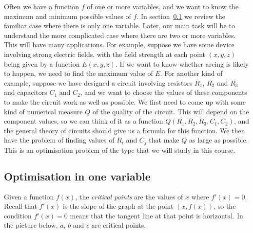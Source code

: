 \documentclass[reqno]{amsart}
\theoremstyle{definition}
\begin{document}
Often we have a function $f$ of one or more variables, and we want to
know the maximum and minimum possible values of $f$.  In
section~\ref{subsec-opt-one} we review the familiar case where there
is only one variable.  Later, our main task will be to understand the
more complicated case where there are two or more variables.  This
will have many applications.  For example, suppose we have some device
involving strong electric fields, with the field strength at each
point $(x,y,z)$ being given by a function $E(x,y,z)$.  If we want to
know whether arcing is likely to happen, we need to find the maximum
value of $E$.  For another kind of example, suppose we have designed a
circuit involving resistors $R_1$, $R_2$ and $R_3$ and capacitors
$C_1$ and $C_2$, and we want to choose the values of these components
to make the circuit work as well as possible.  We first need to come
up with some kind of numerical measure $Q$ of the quality of the
circuit.  This will depend on the component values, so we can think of
it as a function $Q(R_1,R_2,R_3,C_1,C_2)$, and the general theory of
circuits should give us a formula for this function.  We then have the
problem of finding values of $R_i$ and $C_j$ that make $Q$ as large as
possible.  This is an optimisation problem of the type that we will
study in this course.

\subsection{Optimisation in one variable}
\label{subsec-opt-one}

Given a function $f(x)$, the \emph{critical points} are the values of
$x$ where $f'(x)=0$.  Recall that $f'(x)$ is the slope of the graph at
the point $(x,f(x))$, so the condition $f'(x)=0$ means that the
tangent line at that point is horizontal.  In the picture below, $a$,
$b$ and $c$ are critical points.

\begin{center}
\end{center}
\end{document}
